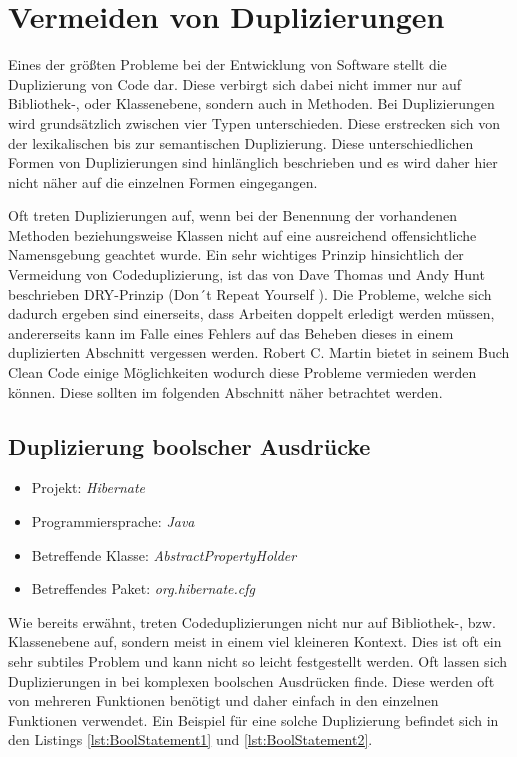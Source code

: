 \newpage
\section{Vermeiden von Duplizierungen}
Eines der größten Probleme bei der Entwicklung von Software stellt die Duplizierung von Code dar. Diese verbirgt sich dabei nicht immer nur auf Bibliothek-, oder Klassenebene, sondern auch in Methoden. Bei Duplizierungen wird grundsätzlich zwischen vier Typen unterschieden. Diese erstrecken sich von der lexikalischen bis zur semantischen Duplizierung. Diese unterschiedlichen Formen von Duplizierungen sind hinlänglich beschrieben \cite{Koschke2007} und es wird daher hier nicht näher auf die einzelnen Formen eingegangen.

Oft treten Duplizierungen auf, wenn bei der Benennung der vorhandenen Methoden beziehungsweise Klassen nicht auf eine ausreichend offensichtliche Namensgebung geachtet wurde. Ein sehr wichtiges Prinzip hinsichtlich der Vermeidung von Codeduplizierung, ist das von Dave Thomas und Andy Hunt beschrieben DRY-Prinzip (Don´t Repeat Yourself \cite{Hunt1999}).
Die Probleme, welche sich dadurch ergeben sind einerseits, dass Arbeiten doppelt erledigt werden müssen, andererseits kann im Falle eines Fehlers auf das Beheben dieses in einem duplizierten Abschnitt vergessen werden. Robert C. Martin bietet in seinem Buch Clean Code einige Möglichkeiten wodurch diese Probleme vermieden werden können. Diese sollten im folgenden Abschnitt näher betrachtet werden.

\subsection{Duplizierung boolscher Ausdrücke}
\label{cha:BadBoolStatements}
\begin{itemize}
	\item Projekt: \textit{Hibernate}
	\item Programmiersprache: \textit{Java}
	\item Betreffende Klasse: \textit{AbstractPropertyHolder}
	\item Betreffendes Paket: \textit{org.hibernate.cfg}
\end{itemize}

\SuperPar Wie bereits erwähnt, treten Codeduplizierungen nicht nur auf Bibliothek-, bzw. Klassenebene auf, sondern meist in einem viel kleineren Kontext. Dies ist oft ein sehr subtiles Problem und kann nicht so leicht festgestellt werden. Oft lassen sich Duplizierungen in bei komplexen boolschen Ausdrücken finde. Diese werden oft von mehreren Funktionen benötigt und daher einfach in den einzelnen Funktionen verwendet. Ein Beispiel für eine solche Duplizierung befindet sich in den Listings \ref{lst:BoolStatement1} und  \ref{lst:BoolStatement2}.

